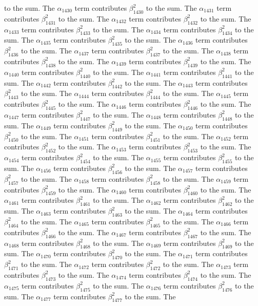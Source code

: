 \begin{lemma}
to the sum. The $\alpha_{1430}$ term contributes $\beta_{1430}^{2}$ to the sum. The $\alpha_{1431}$ term contributes $\beta_{1431}^{2}$ to the sum. The $\alpha_{1432}$ term contributes $\beta_{1432}^{2}$ to the sum. The $\alpha_{1433}$ term contributes $\beta_{1433}^{2}$ to the sum. The $\alpha_{1434}$ term contributes $\beta_{1434}^{2}$ to the sum. The $\alpha_{1435}$ term contributes $\beta_{1435}^{2}$ to the sum. The $\alpha_{1436}$ term contributes $\beta_{1436}^{2}$ to the sum. The $\alpha_{1437}$ term contributes $\beta_{1437}^{2}$ to the sum. The $\alpha_{1438}$ term contributes $\beta_{1438}^{2}$ to the sum. The $\alpha_{1439}$ term contributes $\beta_{1439}^{2}$ to the sum. The $\alpha_{1440}$ term contributes $\beta_{1440}^{2}$ to the sum. The $\alpha_{1441}$ term contributes $\beta_{1441}^{2}$ to the sum. The $\alpha_{1442}$ term contributes $\beta_{1442}^{2}$ to the sum. The $\alpha_{1443}$ term contributes $\beta_{1443}^{2}$ to the sum. The $\alpha_{1444}$ term contributes $\beta_{1444}^{2}$ to the sum. The $\alpha_{1445}$ term contributes $\beta_{1445}^{2}$ to the sum. The $\alpha_{1446}$ term contributes $\beta_{1446}^{2}$ to the sum. The $\alpha_{1447}$ term contributes $\beta_{1447}^{2}$ to the sum. The $\alpha_{1448}$ term contributes $\beta_{1448}^{2}$ to the sum. The $\alpha_{1449}$ term contributes $\beta_{1449}^{2}$ to the sum. The $\alpha_{1450}$ term contributes $\beta_{1450}^{2}$ to the sum. The $\alpha_{1451}$ term contributes $\beta_{1451}^{2}$ to the sum. The $\alpha_{1452}$ term contributes $\beta_{1452}^{2}$ to the sum. The $\alpha_{1453}$ term contributes $\beta_{1453}^{2}$ to the sum. The $\alpha_{1454}$ term contributes $\beta_{1454}^{2}$ to the sum. The $\alpha_{1455}$ term contributes $\beta_{1455}^{2}$ to the sum. The $\alpha_{1456}$ term contributes $\beta_{1456}^{2}$ to the sum. The $\alpha_{1457}$ term contributes $\beta_{1457}^{2}$ to the sum. The $\alpha_{1458}$ term contributes $\beta_{1458}^{2}$ to the sum. The $\alpha_{1459}$ term contributes $\beta_{1459}^{2}$ to the sum. The $\alpha_{1460}$ term contributes $\beta_{1460}^{2}$ to the sum. The $\alpha_{1461}$ term contributes $\beta_{1461}^{2}$ to the sum. The $\alpha_{1462}$ term contributes $\beta_{1462}^{2}$ to the sum. The $\alpha_{1463}$ term contributes $\beta_{1463}^{2}$ to the sum. The $\alpha_{1464}$ term contributes $\beta_{1464}^{2}$ to the sum. The $\alpha_{1465}$ term contributes $\beta_{1465}^{2}$ to the sum. The $\alpha_{1466}$ term contributes $\beta_{1466}^{2}$ to the sum. The $\alpha_{1467}$ term contributes $\beta_{1467}^{2}$ to the sum. The $\alpha_{1468}$ term contributes $\beta_{1468}^{2}$ to the sum. The $\alpha_{1469}$ term contributes $\beta_{1469}^{2}$ to the sum. The $\alpha_{1470}$ term contributes $\beta_{1470}^{2}$ to the sum. The $\alpha_{1471}$ term contributes $\beta_{1471}^{2}$ to the sum. The $\alpha_{1472}$ term contributes $\beta_{1472}^{2}$ to the sum. The $\alpha_{1473}$ term contributes $\beta_{1473}^{2}$ to the sum. The $\alpha_{1474}$ term contributes $\beta_{1474}^{2}$ to the sum. The $\alpha_{1475}$ term contributes $\beta_{1475}^{2}$ to the sum. The $\alpha_{1476}$ term contributes $\beta_{1476}^{2}$ to the sum. The $\alpha_{1477}$ term contributes $\beta_{1477}^{2}$ to the sum. The 
\end{lemma}
